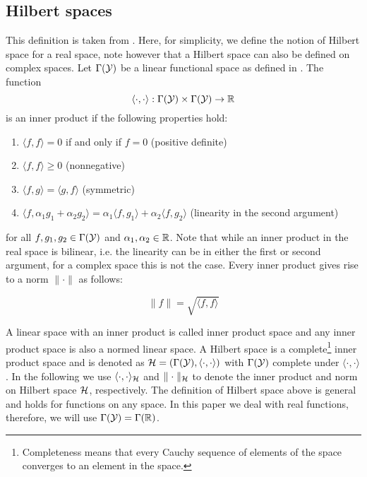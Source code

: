 \subsection{Hilbert spaces}
This definition is taken from \cite{hunter2001applied}. Here, for simplicity, we define the notion of Hilbert space for a real space, note however that a Hilbert space can also be defined on complex spaces. Let $\Gamma(\mathcal{Y})$ be a linear functional space as defined in . The function 
\begin{equation*}
\langle \cdot, \cdot \rangle: \Gamma(\mathcal{Y}) \times \Gamma(\mathcal{Y}) \rightarrow \mathbb{R}
\end{equation*}
is an inner product if the following properties hold:
\begin{enumerate}
	\item $\langle f, f \rangle = 0$ if and only if $f=0$ (positive definite)
	\item $\langle f, f \rangle \geq 0$ (nonnegative)
	\item $\langle f, g \rangle = \langle  g, f \rangle$ (symmetric)
	\item $\langle f, \alpha_1 g_1 + \alpha_2 g_2 \rangle = \alpha_1 \langle f, g_1 \rangle + \alpha_2 \langle f, g_2 \rangle$ (linearity in the second argument)
\end{enumerate}
for all $f,g_1,g_2 \in \Gamma(\mathcal{Y})$ and $\alpha_1, \alpha_2 \in \mathbb{R}$. Note that while an inner product in the real space is bilinear, i.e. the linearity can be in either the first or second argument, for a complex space this is not the case. Every inner product gives rise to a norm $\parallel \cdot \parallel$ as follows:

\begin{equation*}
\parallel f \parallel = \sqrt{\langle f, f \rangle}
\end{equation*}

A linear space with an inner product is called inner product space and any inner product space is also a normed linear space. A Hilbert space is a complete\footnote{Completeness means that every Cauchy sequence of elements of the space converges to an element in the space.} inner product space and is denoted as  $\mathcal{H} = (\Gamma(\mathcal{Y}), \langle \cdot, \cdot \rangle)$ with $\Gamma(\mathcal{Y})$ complete under $\langle \cdot, \cdot \rangle$. In the following we use $\langle \cdot, \cdot \rangle_{\mathcal{H}}$ and $\parallel \cdot \parallel_{\mathcal{H}}$ to denote the inner product and norm on Hilbert space $\mathcal{H}$, respectively. The definition of Hilbert space above is general and holds for functions on any space. In this paper we deal with real functions, therefore, we will use $\Gamma(\mathcal{Y}) = \Gamma(\mathbb{R})$.

